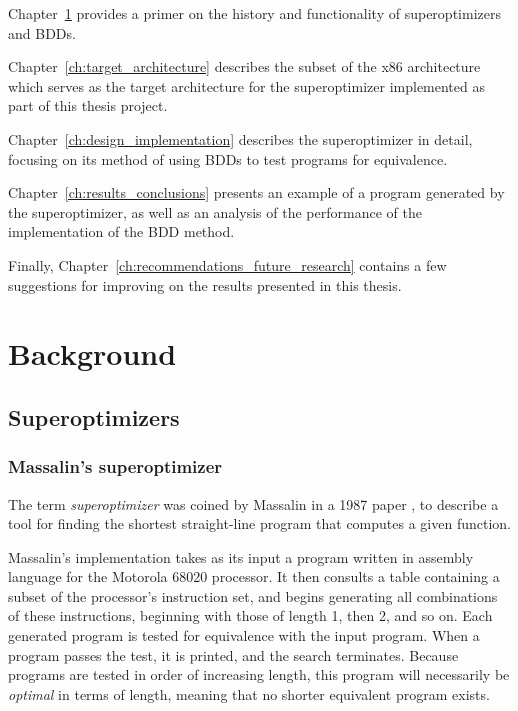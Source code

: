 \documentclass[a4paper,11pt]{kth-mag}
\begin{document}
Chapter~\ref{ch:background} provides a primer on the history and functionality of superoptimizers and BDDs.

Chapter~\ref{ch:target_architecture} describes the subset of the x86 architecture which serves as the target architecture for the superoptimizer implemented as part of this thesis project.

Chapter~\ref{ch:design_implementation} describes the superoptimizer in detail, focusing on its method of using BDDs to test programs for equivalence.

Chapter~\ref{ch:results_conclusions} presents an example of a program generated by the superoptimizer, as well as an analysis of the performance of the implementation of the BDD method.

Finally, Chapter~\ref{ch:recommendations_future_research} contains a few suggestions for improving on the results presented in this thesis.


\chapter{Background}
\label{ch:background}

\section{Superoptimizers}

\subsection{Massalin's superoptimizer}

The term \emph{superoptimizer} was coined by Massalin in a 1987 paper \cite{massalin87}, to describe a tool for finding the shortest straight-line program that computes a given function.

Massalin's implementation takes as its input a program written in assembly language for the Motorola 68020 processor.
It then consults a table containing a subset of the processor's instruction set, and begins generating all combinations of these instructions, beginning with those of length 1, then 2, and so on.
Each generated program is tested for equivalence with the input program.
When a program passes the test, it is printed, and the search terminates.
Because programs are tested in order of increasing length, this program will necessarily be \emph{optimal} in terms of length, meaning that no shorter equivalent program exists.
\end{document}
